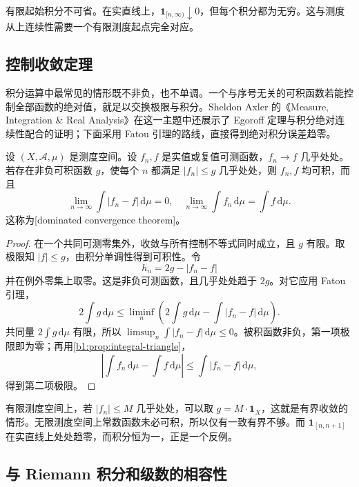 有限起始积分不可省。在实直线上，\(\mathbf1_{[n,\infty)}\downarrow0\)，但每个积分都为无穷。这与测度从上连续性需要一个有限测度起点完全对应。

\subsection{控制收敛定理}
\label{b1:subsec:050303}

积分运算中最常见的情形既不非负，也不单调。一个与序号无关的可积函数若能控制全部函数的绝对值，就足以交换极限与积分。Sheldon Axler 的《Measure, Integration \& Real Analysis》\cite{Axler2020Measure}在这一主题中还展示了 Egoroff 定理与积分绝对连续性配合的证明；下面采用 Fatou 引理的路线，直接得到绝对积分误差趋零。

\begin{theorem}[控制收敛]\label{b1:thm:dominated-convergence}
设 \((X,\mathcal A,\mu)\) 是测度空间。设 \(f_n,f\) 是实值或复值可测函数，\(f_n\to f\) 几乎处处。若存在非负可积函数 \(g\)，使每个 \(n\) 都满足 \(|f_n|\leq g\) 几乎处处，则 \(f_n,f\) 均可积，而且
\[
\lim_{n\to\infty}\int|f_n-f|\,\mathrm d\mu=0,
\quad
\lim_{n\to\infty}\int f_n\,\mathrm d\mu=\int f\,\mathrm d\mu.
\]
这称为[dominated convergence theorem]。
\end{theorem}
\begin{proof}
在一个共同可测零集外，收敛与所有控制不等式同时成立，且 \(g\) 有限。取极限知 \(|f|\leq g\)，由积分单调性得到可积性。令
\[
h_n=2g-|f_n-f|
\]
并在例外零集上取零。这是非负可测函数，且几乎处处趋于 \(2g\)。对它应用 Fatou 引理，
\[
2\int g\,\mathrm d\mu
\leq\liminf_n\left(2\int g\,\mathrm d\mu-\int|f_n-f|\,\mathrm d\mu\right).
\]
共同量 \(2\int g\,\mathrm d\mu\) 有限，所以
\(\limsup_n\int|f_n-f|\,\mathrm d\mu\leq0\)。被积函数非负，第一项极限即为零；再用\cref{b1:prop:integral-triangle}，
\[
\left|\int f_n\,\mathrm d\mu-\int f\,\mathrm d\mu\right|
\leq\int|f_n-f|\,\mathrm d\mu,
\]
得到第二项极限。
\end{proof}

有限测度空间上，若 \(|f_n|\leq M\) 几乎处处，可以取 \(g=M\cdot\mathbf1_X\)，这就是有界收敛的情形。无限测度空间上常数函数未必可积，所以仅有一致有界不够。而 \(\mathbf1_{[n,n+1]}\) 在实直线上处处趋零，而积分恒为一，正是一个反例。

\subsection{与 Riemann 积分和级数的相容性}
\label{b1:subsec:050304-compatibility}

